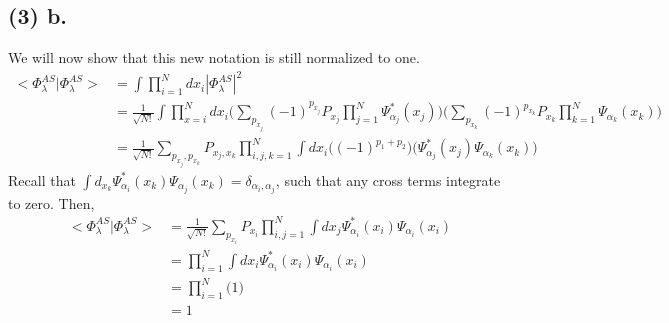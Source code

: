 \documentclass[11 pt, a4paper]{article}
\begin{document}
\subsection*{(3) b.}
We will now show that this new notation is still normalized to one.
\begin{align*}
<\Phi_{\lambda}^{AS}|\Phi_{\lambda}^{AS}> &= \int\prod_{i=1}^Ndx_i |\Phi_{\lambda}^{AS}|^2 \\
&= \frac{1}{\sqrt{N!}}\int\prod_{x=i}^Ndx_i \bigg(\sum\limits_{p_{x_j}} (-1)^{p_{x_j}} P_{x_j} \prod\limits_{j=1}^N \Psi_{\alpha_j}^* (x_j)\bigg)\bigg(\sum\limits_{p_{x_k}} (-1)^{p_{x_k}} P_{x_k} \prod\limits_{k=1}^N \Psi_{\alpha_k} (x_k)\bigg) \\
&= \frac{1}{\sqrt{N!}}\sum\limits_{p_{x_j},p_{x_k}} P_{x_j,x_k} \prod_{i,j,k=1}^N\int dx_i \bigg((-1)^{p_1+p_2}\bigg) \bigg(\Psi_{\alpha_j}^*(x_j) \Psi_{\alpha_k}(x_k)\bigg)
\end{align*}	
Recall that $\int d_{x_k} \Psi_{\alpha_i}^* (x_k) \Psi_{\alpha_j} (x_k) = \delta_{\alpha_i,\alpha_j}$, such that any cross terms integrate to zero. Then,
\begin{align*}
<\Phi_{\lambda}^{AS}|\Phi_{\lambda}^{AS}> &= \frac{1}{\sqrt{N!}}\sum\limits_{p_{x_i}} P_{x_i} \prod_{i,j=1}^N\int dx_j \Psi_{\alpha_i}^*(x_i) \Psi_{\alpha_i}(x_i) \\
&= \prod_{i=1}^N\int dx_i \Psi_{\alpha_i}^*(x_i) \Psi_{\alpha_i}(x_i) \\
&= \prod_{i=1}^N \bigg(1\bigg	) \\
&= 1
\end{align*}
\end{document}
